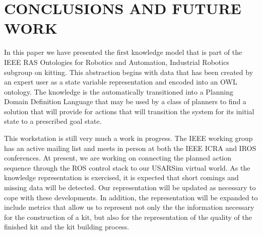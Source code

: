 \section{CONCLUSIONS AND FUTURE WORK}
\label{sect:Conclusions}
In this paper we have presented the first knowledge model that is part of the IEEE RAS Ontologies for Robotics and Automation, Industrial Robotics subgroup on kitting.
This abstraction begins with data that has been created by an expert user as a state variable representation and encoded into an OWL ontology. The knowledge
is the automatically transitioned into a Planning Domain Definition Language that may be used by a class of planners to find a solution that will provide for actions that will
transition the system for its initial state to a prescribed goal state.

This workstation is still very much a work in progress. The IEEE working group has an active mailing list and meets in person at both the IEEE ICRA and IROS conferences.
At present, we are working on connecting the planned action sequence through the ROS control stack to our USARSim virtual world. As the knowledge representation is
exercised, it is expected that short comings and missing data will be detected. Our representation will be updated as necessary to cope with these developments. In addition,
the representation will be expanded to include metrics that allow us to represent not only the the information necessary for the construction of a kit, but also for the representation
of the quality of the finished kit and the kit building process.




